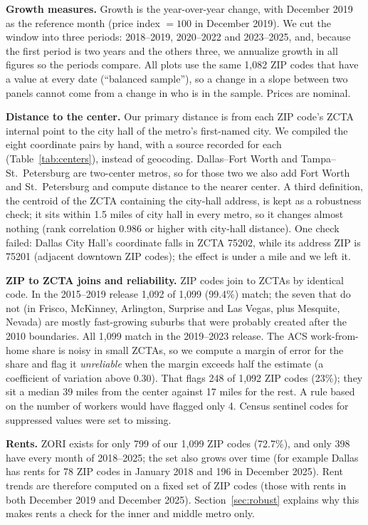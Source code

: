 \documentclass[11pt]{article}
\begin{document}
\textbf{Growth measures.} Growth is the year-over-year change, with December 2019 as the reference month (price index
$=100$ in December 2019). We cut the window into three periods: 2018--2019, 2020--2022 and 2023--2025, and, because the
first period is two years and the others three, we annualize growth in all figures so the periods compare. All plots use the
same 1,082 ZIP codes that have a value at every date (``balanced sample''), so a change in a slope between two panels cannot
come from a change in who is in the sample. Prices are nominal.

\textbf{Distance to the center.} Our primary distance is from each ZIP code's ZCTA internal point to the city hall of the
metro's first-named city. We compiled the eight coordinate pairs by hand, with a source recorded for each
(Table~\ref{tab:centers}), instead of geocoding. Dallas--Fort Worth and Tampa--St.\ Petersburg are two-center metros, so for
those two we also add Fort Worth and St.\ Petersburg and compute distance to the nearer center. A third definition, the
centroid of the ZCTA containing the city-hall address, is kept as a robustness check; it sits within 1.5 miles of city hall in
every metro, so it changes almost nothing (rank correlation 0.986 or higher with city-hall distance). One check failed:
Dallas City Hall's coordinate falls in ZCTA 75202, while its address ZIP is 75201 (adjacent downtown ZIP codes); the effect is
under a mile and we left it.

\textbf{ZIP to ZCTA joins and reliability.} ZIP codes join to ZCTAs by identical code. In the 2015--2019 release 1,092 of 1,099
(99.4\%) match; the seven that do not (in Frisco, McKinney, Arlington, Surprise and Las Vegas, plus Mesquite, Nevada) are
mostly fast-growing suburbs that were probably created after the 2010 boundaries. All 1,099 match in the 2019--2023 release.
The ACS work-from-home share is noisy in small ZCTAs, so we compute a margin of error for the share and flag it
\emph{unreliable} when the margin exceeds half the estimate (a coefficient of variation above 0.30). That flags 248 of 1,092
ZIP codes (23\%); they sit a median 39 miles from the center against 17 miles for the rest. A rule based on the number of
workers would have flagged only 4. Census sentinel codes for suppressed values were set to missing.

\textbf{Rents.} ZORI exists for only 799 of our 1,099 ZIP codes (72.7\%), and only 398 have every month of 2018--2025; the
set also grows over time (for example Dallas has rents for 78 ZIP codes in January 2018 and 196 in December 2025). Rent
trends are therefore computed on a fixed set of ZIP codes (those with rents in both December 2019 and December 2025).
Section~\ref{sec:robust} explains why this makes rents a check for the inner and middle metro only.
\end{document}
